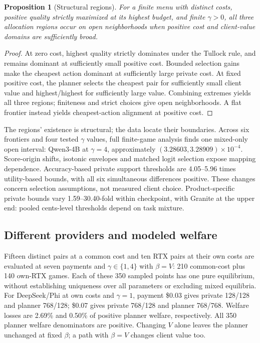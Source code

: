 \documentclass[sigconf,anonymous,nonacm]{acmart}
\newtheorem{proposition}{Proposition}
\begin{document}
\begin{proposition}[Structural regions]
For a finite menu with distinct costs, positive quality strictly maximized at its highest budget, and finite $\gamma>0$, all three allocation regions occur on open neighborhoods when positive cost and client-value domains are sufficiently broad.
\end{proposition}
\begin{proof}
At zero cost, highest quality strictly dominates under the Tullock rule, and remains dominant at sufficiently small positive cost. Bounded selection gains make the cheapest action dominant at sufficiently large private cost. At fixed positive cost, the planner selects the cheapest pair for sufficiently small client value and highest/highest for sufficiently large value. Combining extremes yields all three regions; finiteness and strict choices give open neighborhoods. A flat frontier instead yields cheapest-action alignment at positive cost.
\end{proof}
The regions' existence is structural; the data locate their boundaries. Across six frontiers and four tested $\gamma$ values, full finite-game analysis finds one mixed-only open interval: Qwen3-4B at $\gamma=4$, approximately $(3.28603,3.28909)\times10^{-4}$. Score-origin shifts, isotonic envelopes and matched logit selection expose mapping dependence. Accuracy-based private support thresholds are 4.05--5.96 times utility-based bounds, with all six simultaneous differences positive. These changes concern selection assumptions, not measured client choice. Product-specific private bounds vary 1.59--30.40-fold within checkpoint, with Granite at the upper end: pooled cents-level thresholds depend on task mixture.

\subsection{Different providers and modeled welfare}
Fifteen distinct pairs at a common cost and ten RTX pairs at their own costs are evaluated at seven payments and $\gamma\in\{1,4\}$ with $\beta=V$: 210 common-cost plus 140 own-RTX games. Each of these 350 sampled points has one pure equilibrium, without establishing uniqueness over all parameters or excluding mixed equilibria. For DeepSeek/Phi at own costs and $\gamma=1$, payment \$0.03 gives private 128/128 and planner 768/128; \$0.07 gives private 768/128 and planner 768/768. Welfare losses are 2.69\% and 0.50\% of positive planner welfare, respectively. All 350 planner welfare denominators are positive. Changing $V$ alone leaves the planner unchanged at fixed $\beta$; a path with $\beta=V$ changes client value too.
\end{document}
